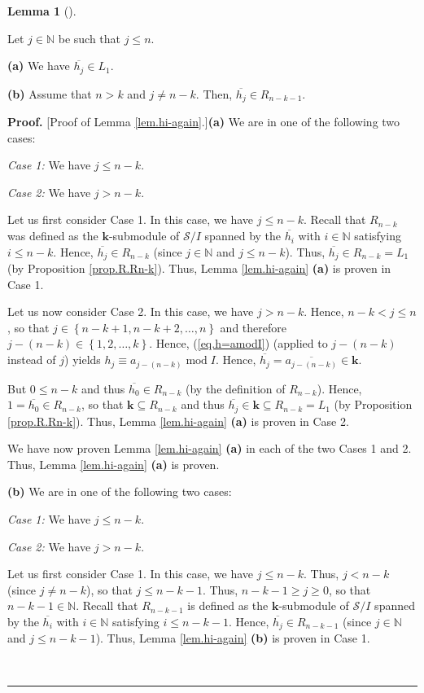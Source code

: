 \documentclass[numbers=enddot,12pt,final,onecolumn,notitlepage]{scrartcl}%
\theoremstyle{definition}
\newtheorem{lem}[theo]{Lemma}
\newenvironment{lemma}[1][]
{\begin{lem}[#1]\begin{leftbar}}
{\end{leftbar}\end{lem}}
\newenvironment{proof}[1][Proof]{\noindent\textbf{#1.} }{\ \rule{0.5em}{0.5em}}
\begin{document}
\begin{lemma}
\label{lem.hi-again}Let $j\in\mathbb{N}$ be such that $j\leq n$.

\textbf{(a)} We have $\overline{h_{j}}\in L_{1}$.

\textbf{(b)} Assume that $n>k$ and $j\neq n-k$. Then, $\overline{h_{j}}\in
R_{n-k-1}$.
\end{lemma}

\begin{proof}
[Proof of Lemma \ref{lem.hi-again}.]\textbf{(a)} We are in one of the
following two cases:

\textit{Case 1:} We have $j\leq n-k$.

\textit{Case 2:} We have $j>n-k$.

Let us first consider Case 1. In this case, we have $j\leq n-k$. Recall that
$R_{n-k}$ was defined as the $\mathbf{k}$-submodule of $\mathcal{S}/I$ spanned
by the $\overline{h_{i}}$ with $i\in\mathbb{N}$ satisfying $i\leq n-k$. Hence,
$\overline{h_{j}}\in R_{n-k}$ (since $j\in\mathbb{N}$ and $j\leq n-k$). Thus,
$\overline{h_{j}}\in R_{n-k}=L_{1}$ (by Proposition \ref{prop.R.Rn-k}). Thus,
Lemma \ref{lem.hi-again} \textbf{(a)} is proven in Case 1.

Let us now consider Case 2. In this case, we have $j>n-k$. Hence, $n-k<j\leq
n$, so that $j\in\left\{  n-k+1,n-k+2,\ldots,n\right\}  $ and therefore
$j-\left(  n-k\right)  \in\left\{  1,2,\ldots,k\right\}  $. Hence,
(\ref{eq.h=amodI}) (applied to $j-\left(  n-k\right)  $ instead of $j$) yields
$h_{j}\equiv a_{j-\left(  n-k\right)  }\operatorname{mod}I$. Hence,
$\overline{h_{j}}=\overline{a_{j-\left(  n-k\right)  }}\in\mathbf{k}$.

But $0\leq n-k$ and thus $\overline{h_{0}}\in R_{n-k}$ (by the definition of
$R_{n-k}$). Hence, $1=\overline{h_{0}}\in R_{n-k}$, so that $\mathbf{k}%
\subseteq R_{n-k}$ and thus $\overline{h_{j}}\in\mathbf{k}\subseteq
R_{n-k}=L_{1}$ (by Proposition \ref{prop.R.Rn-k}). Thus, Lemma
\ref{lem.hi-again} \textbf{(a)} is proven in Case 2.

We have now proven Lemma \ref{lem.hi-again} \textbf{(a)} in each of the two
Cases 1 and 2. Thus, Lemma \ref{lem.hi-again} \textbf{(a)} is proven.

\textbf{(b)} We are in one of the following two cases:

\textit{Case 1:} We have $j\leq n-k$.

\textit{Case 2:} We have $j>n-k$.

Let us first consider Case 1. In this case, we have $j\leq n-k$. Thus, $j<n-k$
(since $j\neq n-k$), so that $j\leq n-k-1$. Thus, $n-k-1\geq j\geq0$, so that
$n-k-1\in\mathbb{N}$. Recall that $R_{n-k-1}$ is defined as the $\mathbf{k}%
$-submodule of $\mathcal{S}/I$ spanned by the $\overline{h_{i}}$ with
$i\in\mathbb{N}$ satisfying $i\leq n-k-1$. Hence, $\overline{h_{j}}\in
R_{n-k-1}$ (since $j\in\mathbb{N}$ and $j\leq n-k-1$). Thus, Lemma
\ref{lem.hi-again} \textbf{(b)} is proven in Case 1.


\end{proof}
\end{document}
